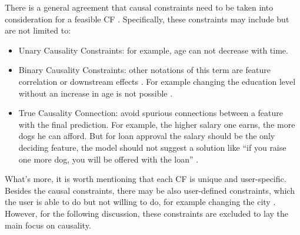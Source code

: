 There is a general agreement that causal constraints need to be taken into consideration for a feasible CF \cite{algorithmicrecourse}. Specifically, these constraints may include but are not limited to:
 \begin{itemize}
   \item Unary Causality Constraints: for example, age can not decrease with time.
   \item Binary Causality Constraints: other notations of this term are feature correlation \cite{preservingCausal} or downstream effects \cite{algorithmicrecourse}. For example changing the education level without an increase in age is not possible \cite{DiCE}.
   \item True Causality Connection: avoid spurious connections between a feature with the final prediction. For example, the higher salary one earns, the more dogs he can afford. But for loan approval the salary should be the only deciding feature, the model should not suggest a solution like ``if you raise one more dog, you will be offered with the loan'' \cite{diffThatMakesDiff}.
 \end{itemize}

What's more, it is worth mentioning that each CF is unique and user-specific. Besides the causal constraints, there may be also user-defined constraints, which the user is able to do but not willing to do, for example changing the city \cite{preservingCausal}. However, for the following discussion, these constraints are excluded to lay the main focus on causality.


